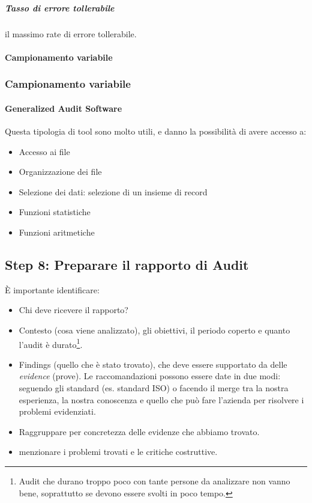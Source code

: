 \subparagraph*{Tasso di errore tollerabile} il massimo rate di errore tollerabile.

\paragraph*{Campionamento variabile}


\subsubsection{Campionamento variabile}




\paragraph{Generalized Audit Software}

Questa tipologia di tool sono molto utili, e danno la possibilità di avere accesso a:
\begin{itemize}
\item Accesso ai file
\item Organizzazione dei file
\item Selezione dei dati: selezione di un insieme di record
\item Funzioni statistiche
\item Funzioni aritmetiche
\end{itemize}

\subsection{Step 8: Preparare il rapporto di Audit}

È importante identificare:
\begin{itemize}
\item Chi deve ricevere il rapporto?
\item Contesto (cosa viene analizzato), gli obiettivi, il periodo coperto e quanto l'audit è durato\footnote{Audit che durano troppo poco con tante persone da analizzare non vanno bene, soprattutto se devono essere svolti in poco tempo.}.
\item Findings (quello che è stato trovato), che deve essere supportato da delle \emph{evidence} (prove). Le raccomandazioni possono essere date in due modi: seguendo gli standard (es. standard ISO) o facendo il merge tra la nostra esperienza, la nostra conoscenza e quello che può fare l'azienda per risolvere i problemi evidenziati.
\item Raggruppare per concretezza delle evidenze che abbiamo trovato.
\item menzionare i problemi trovati e le critiche costruttive.
\end{itemize}

